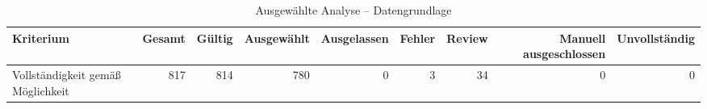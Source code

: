 \begin{table}[htbp]
\centering
\caption{Ausgewählte Analyse -- Datengrundlage}
\begin{tabular}{lrrrrrrrr}
\toprule
Kriterium & Gesamt & Gültig & Ausgewählt & Ausgelassen & Fehler & Review & Manuell ausgeschlossen & Unvollständig \\
\midrule
Vollständigkeit gemäß Möglichkeit & 817 & 814 & 780 & 0 & 3 & 34 & 0 & 0 \\
\bottomrule
\end{tabular}
\end{table}
